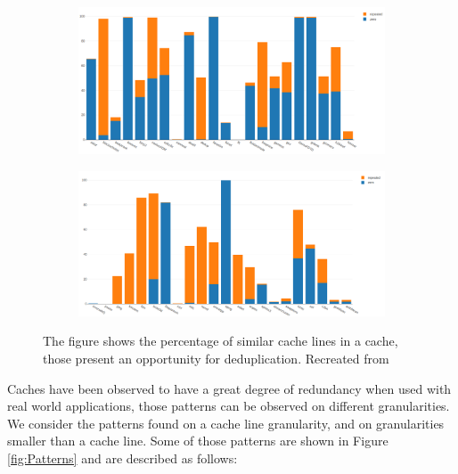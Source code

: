 \begin{figure}
    \begin{subfigure}[t]{\textwidth}
        \includegraphics[width=\textwidth]{DedupPotential1.png}
    \end{subfigure}
    \begin{subfigure}[b]{\textwidth}
        \includegraphics[width=\textwidth]{DedupPotential2.png}
    \end{subfigure}
    \caption[Inter-line Patterns]{The figure shows the percentage of similar cache lines in a cache, those present an opportunity for deduplication. Recreated from \protect\cite{dedup}}
    \label{fig:DedupPotential}
\end{figure}
Caches have been observed to have a great degree of redundancy when used with real world applications, those patterns can be observed on different granularities. We consider the patterns found on a cache line granularity, and on granularities smaller than a cache line. Some of those patterns are shown in Figure \ref{fig:Patterns} and are described as follows:
